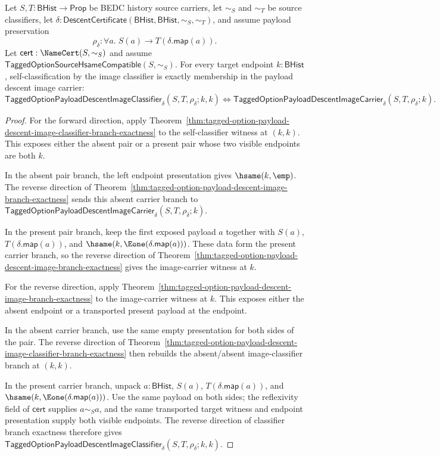 \begin{theorem}
\label{thm:tagged-option-payload-descent-image-classifier-self-exactness}
Let $S,T:\mathsf{BHist}\to\mathsf{Prop}$ be BEDC history source carriers, let
$\sim_S$ and $\sim_T$ be source classifiers, let
$\delta:\mathsf{DescentCertificate}(\mathsf{BHist},\mathsf{BHist},\sim_S,\sim_T)$,
and assume payload preservation
$$
\rho_{\delta}:\forall a.\;S(a)\to T(\delta.\mathsf{map}(a)).
$$
Let $\mathsf{cert}:\NameCert(S,\sim_S)$ and assume
$\mathsf{TaggedOptionSourceHsameCompatible}(S,\sim_S)$. For every target endpoint
$k:\mathsf{BHist}$, self-classification by the image classifier is exactly
membership in the payload descent image carrier:
$$
\mathsf{TaggedOptionPayloadDescentImageClassifier}_{\delta}
(S,T,\rho_{\delta};k,k)
\Longleftrightarrow
\mathsf{TaggedOptionPayloadDescentImageCarrier}_{\delta}
(S,T,\rho_{\delta};k).
$$
\end{theorem}
\begin{proof}
For the forward direction, apply
Theorem~\ref{thm:tagged-option-payload-descent-image-classifier-branch-exactness}
to the self-classifier witness at $(k,k)$. This exposes either the absent pair
or a present pair whose two visible endpoints are both $k$.

In the absent pair branch, the left endpoint presentation gives
$\hsame(k,\emp)$. The reverse direction of
Theorem~\ref{thm:tagged-option-payload-descent-image-branch-exactness} sends this
absent carrier branch to
$\mathsf{TaggedOptionPayloadDescentImageCarrier}_{\delta}
(S,T,\rho_{\delta};k)$.

In the present pair branch, keep the first exposed payload $a$ together with
$S(a)$, $T(\delta.\mathsf{map}(a))$, and
$\hsame(k,\Eone(\delta.\mathsf{map}(a)))$. These data form the present carrier
branch, so the reverse direction of
Theorem~\ref{thm:tagged-option-payload-descent-image-branch-exactness} gives the
image-carrier witness at $k$.

For the reverse direction, apply
Theorem~\ref{thm:tagged-option-payload-descent-image-branch-exactness} to the
image-carrier witness at $k$. This exposes either the absent endpoint or a
transported present payload at the endpoint.

In the absent carrier branch, use the same empty presentation for both sides of
the pair. The reverse direction of
Theorem~\ref{thm:tagged-option-payload-descent-image-classifier-branch-exactness}
then rebuilds the absent/absent image-classifier branch at $(k,k)$.

In the present carrier branch, unpack $a:\mathsf{BHist}$, $S(a)$,
$T(\delta.\mathsf{map}(a))$, and
$\hsame(k,\Eone(\delta.\mathsf{map}(a)))$. Use the same payload on both sides;
the reflexivity field of $\mathsf{cert}$ supplies $a\sim_S a$, and the same
transported target witness and endpoint presentation supply both visible
endpoints. The reverse direction of classifier branch exactness therefore gives
$\mathsf{TaggedOptionPayloadDescentImageClassifier}_{\delta}
(S,T,\rho_{\delta};k,k)$.
\end{proof}

